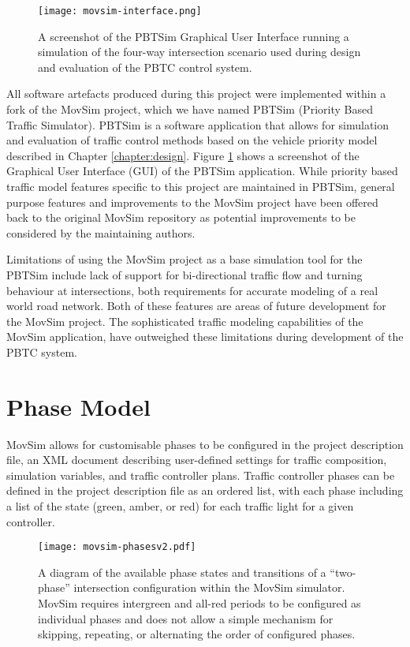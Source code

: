 \begin{figure}[]
\centering
	\texttt{[image: movsim-interface.png]}
	\caption[A screenshot of the PBTSim user interface showing an example intersection.]{ A screenshot of the PBTSim Graphical User Interface running a simulation of the four-way intersection scenario used during design and evaluation of the PBTC control system. }
\label{pbtsim-interface}
\end{figure}

All software artefacts produced during this project were implemented within a fork of the MovSim project, which we have named PBTSim (Priority Based Traffic Simulator). PBTSim is a software application that allows for simulation and evaluation of traffic control methods based on the vehicle priority model described in Chapter \ref{chapter:design}. Figure \ref{pbtsim-interface} shows a screenshot of the Graphical User Interface (GUI) of the PBTSim application. While priority based traffic model features specific to this project are maintained in PBTSim, general purpose features and improvements to the MovSim project have been offered back to the original MovSim repository as potential improvements to be considered by the maintaining authors. 

Limitations of using the MovSim project as a base simulation tool for the PBTSim include lack of support for bi-directional traffic flow and turning behaviour at intersections, both requirements for accurate modeling of a real world road network. Both of these features are areas of future development for the MovSim project. The sophisticated traffic modeling capabilities of the MovSim application, have outweighed these limitations during development of the PBTC system.

\section{Phase Model}

MovSim allows for customisable phases to be configured in the project description file, an XML document describing user-defined settings for traffic composition, simulation variables, and traffic controller plans. Traffic controller phases can be defined in the project description file as an ordered list, with each phase including a list of the state (green, amber, or red) for each traffic light for a given controller. 

\begin{figure}[]
\centering
	\texttt{[image: movsim-phasesv2.pdf]}
	\caption[A diagram of a set of phase states for a two-phase intersection within the MovSim simulator.]{ A diagram of the available phase states and transitions of a ``two-phase'' intersection configuration within the MovSim simulator. MovSim requires intergreen and all-red periods to be configured as individual phases and does not allow a simple mechanism for skipping, repeating, or alternating the order of configured phases. }
\label{movsimphasediagram}
\end{figure}

